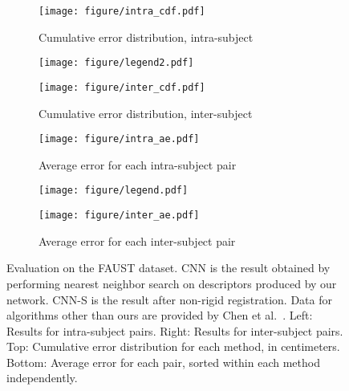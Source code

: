 \documentclass[10pt,twocolumn,letterpaper]{article}
\begin{document}

\begin{figure*}
\centering
\begin{subfigure}{.42\textwidth}
  \centering
  \texttt{[image: figure/intra\_cdf.pdf]}
  \caption{Cumulative error distribution, intra-subject}
\end{subfigure}%
\begin{subfigure}{.16\textwidth}
  \centering
  \texttt{[image: figure/legend2.pdf]}
\end{subfigure}%
\begin{subfigure}{.42\textwidth}
  \centering
  \texttt{[image: figure/inter\_cdf.pdf]}
  \caption{Cumulative error distribution, inter-subject}
\end{subfigure}

\begin{subfigure}{.42\textwidth}
  \centering
  \texttt{[image: figure/intra\_ae.pdf]}
  \caption{Average error for each intra-subject pair}
\end{subfigure}%
\begin{subfigure}{.16\textwidth}
  \centering
  \texttt{[image: figure/legend.pdf]}
\end{subfigure}%
\begin{subfigure}{.42\textwidth}
  \centering
  \texttt{[image: figure/inter\_ae.pdf]}
  \caption{Average error for each inter-subject pair}
\end{subfigure}

\caption{Evaluation on the FAUST dataset. \textsf{CNN} is the result obtained by performing nearest neighbor search on descriptors produced by our network. \textsf{CNN-S} is the result after non-rigid registration. Data for algorithms other than ours are provided by Chen et al.~\cite{chen15}. Left: Results for intra-subject pairs. Right: Results for inter-subject pairs. Top: Cumulative error distribution for each method, in centimeters. Bottom: Average error for each pair, sorted within each method independently.}
\label{fig:test}
\end{figure*}
\end{document}
